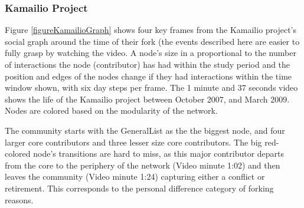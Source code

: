 \documentclass{acm_proc_article-sp}
\begin{document}
\subsubsection{Kamailio Project}
Figure \ref{figureKamailioGraph} shows four key frames from the Kamailio project's social graph around the time of their fork (the events described here are easier to fully grasp by watching the video. A node's size in a proportional to the number of interactions the node (contributor) has had within the study period and the position and edges of the nodes change if they had interactions within the time window shown, with six day steps per frame. The 1 minute and 37 seconds video shows the life of the Kamailio project between October 2007, and March 2009. Nodes are colored based on the modularity of the network.

The community starts with the GeneralList as the the biggest node, and four larger core contributors and three lesser size core contributors. The big red-colored node's transitions are hard to miss, as this major contributor departs from the core to the periphery of the network (Video minute 1:02) and then leaves the community (Video minute 1:24) capturing either a conflict or retirement. This corresponds to the personal difference category of forking reasons.
\end{document}
